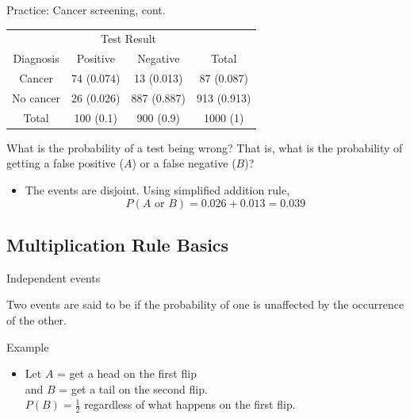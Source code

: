 \documentclass[xcolor=table, handout]{beamer}
\begin{document}
\begin{frame}{Practice: Cancer screening, cont.}
\begin{block}{}
{\centering
\begin{tabular}{c | c  c | c}
\multicolumn{1}{c}{} & \multicolumn{2}{c}{Test Result}\\
Diagnosis & Positive & Negative & Total \\
\hline
Cancer & 74 (0.074) & 13 (0.013) & 87 (0.087)\\
No cancer & 26 (0.026) & 887 (0.887) & 913 (0.913)\\
\hline
Total & 100 (0.1) & 900 (0.9) & 1000 (1)
\end{tabular}\par
}
\end{block}

\begin{exampleblock}{}
What is the probability of a test being wrong? That is, what is the probability of getting a false positive ($A$) or a false negative ($B$)?

\begin{itemize}
\pause
\item The events are disjoint. Using simplified addition rule,
\[ P(A \text{ or } B) = 0.026 + 0.013 = 0.039\]
\end{itemize}
\end{exampleblock}
\end{frame}

\subsection{Multiplication Rule Basics}

\begin{frame}{Independent events}
\begin{block}{}
\large Two events are said to be  if the probability of one is unaffected by the occurrence of the other.
\end{block}

\pause

\begin{exampleblock}{Example}
\begin{itemize}
\item Let $A$ = get a head on the first flip\\
and $B$ = get a tail on the second flip.\\
$P(B) = \frac 1 2$ regardless of what happens on the first flip.
\end{itemize}
\end{exampleblock}
\end{frame}
\end{document}
